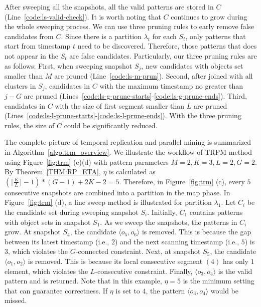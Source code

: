 After sweeping all the snapshots, all the valid patterns are stored in $C$(Line~\ref{code:ls-valid-check}). 
It is worth noting that $C$ continues to grow during the whole sweeping process. We can use three pruning rules to 
early remove false candidates from $C$. Since there is a partition $\lambda_t$ for each $S_t$, only patterns that start from timestamp $t$ need to be discovered. Therefore, those patterns that does not appear in the $S_t$ are false candidates. Particularly, our
three pruning rules are as follows:
First, when sweeping snapshot $S_j$, new candidates with objects set smaller than $M$ are pruned (Line~\ref{code:ls-m-prun}). Second, after joined with all clusters in $S_j$, 
candidates in $C$ with the maximum timestamp no greater than $j-G$ are pruned (Lines~\ref{code:ls-g-prune-starts}-\ref{code:ls-g-prune-ends}). Third, candidates in $C$ with the size of first segment smaller than $L$
are pruned (Lines~\ref{code:ls-l-prune-starts}-\ref{code:ls-l-prune-ends}). With the three pruning rules, the size of $C$ could be significantly reduced.  

The complete picture of temporal replication and parallel mining is summarized in Algorithm~\ref{algo:trm_overview}. We illustrate the workflow of TRPM method using Figure~\ref{fig:trm} (c)(d) with pattern
parameters $M=2, K=3, L = 2, G=2$. By Theorem~\ref{THM:RP_ETA}, $\eta$ is calculated
as $(\lceil \frac{K}{L} \rceil-1) *(G-1)+2K - 2 = 5$. Therefore, 
in Figure~\ref{fig:trm} (c), every $5$ consecutive snapshots are combined 
into a partition in the map phase. In Figure~\ref{fig:trm} (d), a line sweep
method is illustrated for partition $\lambda_1$. Let $C_i$ be the candidate set
during sweeping snapshot $S_i$.
Initially, $C_1$ contains patterns with object sets in snapshot $S_1$.
As we sweep the snapshots, the patterns in $C_i$ grow. At snapshot $S_4$, the candidate
$\langle o_5,o_6 \rangle$ is removed. This is because the gap between its latest timestamp (i.e., $2$)
and the next scanning timestamp (i.e., $5$) is $3$, which violates the $G$-connected constraint.
Next, at snapshot $S_5$, the candidate $\langle o_1,o_2 \rangle$ is removed. This is
because its local consecutive segment $(4)$ has only $1$ element,
which violates the $L$-consecutive constraint.
Finally, $\langle o_3,o_4 \rangle$ is the valid pattern and is returned. Note that in this example, $\eta=5$ is the minimum setting that can guarantee correctness. If $\eta$ is set to $4$, the pattern $\langle o_3,o_4 \rangle$ would be missed. 

